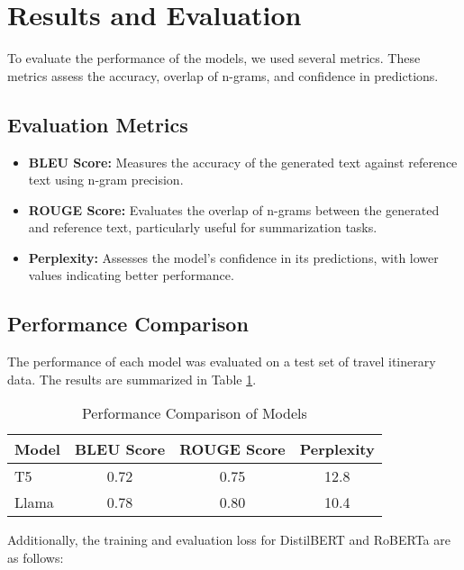 \documentclass[conference]{IEEEtran}
\begin{document}
\section{Results and Evaluation}

    To evaluate the performance of the models, we used several metrics. These metrics assess the accuracy, overlap of n-grams, and confidence in predictions.
    \subsection{Evaluation Metrics}

        \begin{itemize}
            \item \textbf{BLEU Score:} Measures the accuracy of the generated text against reference text using n-gram precision.
            \item \textbf{ROUGE Score:} Evaluates the overlap of n-grams between the generated and reference text, particularly useful for summarization tasks.
            \item \textbf{Perplexity:} Assesses the model's confidence in its predictions, with lower values indicating better performance.
        \end{itemize}

    \subsection{Performance Comparison}

        The performance of each model was evaluated on a test set of travel itinerary data. The results are summarized in Table \ref{tab:results}.

        \begin{table}[htbp]
        \caption{Performance Comparison of Models}
        \centering
        \begin{tabular}{|l|c|c|c|}
        \hline
        \textbf{Model} & \textbf{BLEU Score} & \textbf{ROUGE Score} & \textbf{Perplexity} \\
        \hline
        T5 & 0.72 & 0.75 & 12.8 \\
        Llama & 0.78 & 0.80 & 10.4 \\
        \hline
        \end{tabular}
        \label{tab:results}
        \end{table}

    Additionally, the training and evaluation loss for DistilBERT and RoBERTa are as follows:
\end{document}
